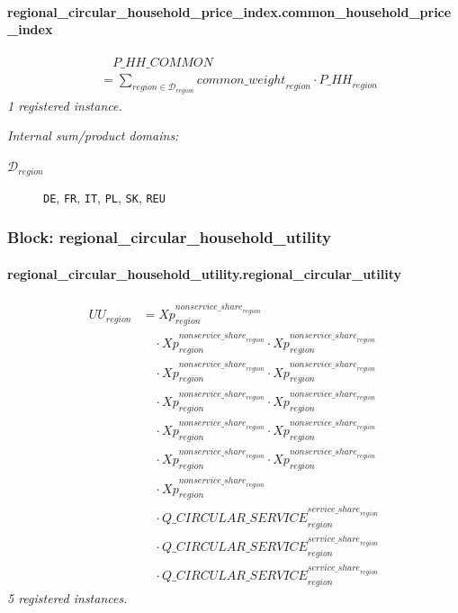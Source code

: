 \documentclass[11pt]{article}
\begin{document}
\paragraph{regional\_circular\_household\_price\_index.common\_household\_price\_index}
\begin{align*}
&\quad P\_HH\_COMMON\\
&= \sum_{region \in \mathcal{D}_{region}} {common\_weight}_{region} \cdot {P\_HH}_{region}
\end{align*}
\noindent\emph{1 registered instance.}\par
\noindent\emph{Internal sum/product domains:}\par
\begin{description}
\item[\(\mathcal{D}_{region}\)] \texttt{DE}, \texttt{FR}, \texttt{IT}, \texttt{PL}, \texttt{SK}, \texttt{REU}
\end{description}
\subsubsection*{Block: regional\_circular\_household\_utility}
\paragraph{regional\_circular\_household\_utility.regional\_circular\_utility}
\begin{align*}
UU_{region} &= Xp_{region}^{{nonservice\_share}_{region}}\\
&\quad {}\cdot Xp_{region}^{{nonservice\_share}_{region}} \cdot Xp_{region}^{{nonservice\_share}_{region}}\\
&\quad {}\cdot Xp_{region}^{{nonservice\_share}_{region}} \cdot Xp_{region}^{{nonservice\_share}_{region}}\\
&\quad {}\cdot Xp_{region}^{{nonservice\_share}_{region}} \cdot Xp_{region}^{{nonservice\_share}_{region}}\\
&\quad {}\cdot Xp_{region}^{{nonservice\_share}_{region}} \cdot Xp_{region}^{{nonservice\_share}_{region}}\\
&\quad {}\cdot Xp_{region}^{{nonservice\_share}_{region}} \cdot Xp_{region}^{{nonservice\_share}_{region}}\\
&\quad {}\cdot Xp_{region}^{{nonservice\_share}_{region}}\\
&\quad {}\cdot {Q\_CIRCULAR\_SERVICE}_{region}^{{service\_share}_{region}}\\
&\quad {}\cdot {Q\_CIRCULAR\_SERVICE}_{region}^{{service\_share}_{region}}\\
&\quad {}\cdot {Q\_CIRCULAR\_SERVICE}_{region}^{{service\_share}_{region}}
\end{align*}
\noindent\emph{5 registered instances.}\par
\end{document}
